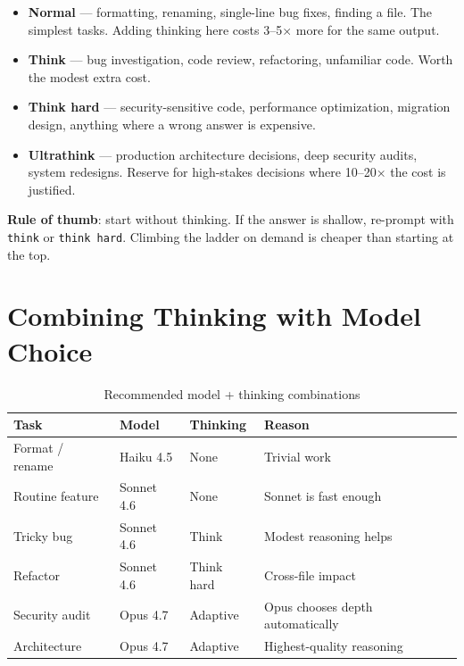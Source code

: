 \begin{itemize}
  \item \textbf{Normal} — formatting, renaming, single-line bug fixes,
        finding a file. The simplest tasks. Adding thinking here costs
        3--5× more for the same output.
  \item \textbf{Think} — bug investigation, code review, refactoring,
        unfamiliar code. Worth the modest extra cost.
  \item \textbf{Think hard} — security-sensitive code, performance
        optimization, migration design, anything where a wrong answer is
        expensive.
  \item \textbf{Ultrathink} — production architecture decisions, deep
        security audits, system redesigns. Reserve for high-stakes
        decisions where 10--20× the cost is justified.
\end{itemize}

\textbf{Rule of thumb}: start without thinking. If the answer is shallow,
re-prompt with \texttt{think} or \texttt{think hard}. Climbing the ladder
on demand is cheaper than starting at the top.

\section{Combining Thinking with Model Choice}
\label{sec:thinking-models}

\begin{table}[ht]
\centering
\caption{Recommended model + thinking combinations}
\label{tab:thinking-combos}
\begin{tabularx}{\textwidth}{lllX}
\toprule
\textbf{Task} & \textbf{Model} & \textbf{Thinking} & \textbf{Reason} \\
\midrule
Format / rename   & Haiku 4.5   & None        & Trivial work \\
Routine feature   & Sonnet 4.6  & None        & Sonnet is fast enough \\
Tricky bug        & Sonnet 4.6  & Think       & Modest reasoning helps \\
Refactor          & Sonnet 4.6  & Think hard  & Cross-file impact \\
Security audit    & Opus 4.7    & Adaptive    & Opus chooses depth automatically \\
Architecture      & Opus 4.7    & Adaptive    & Highest-quality reasoning \\
\bottomrule
\end{tabularx}
\end{table}

